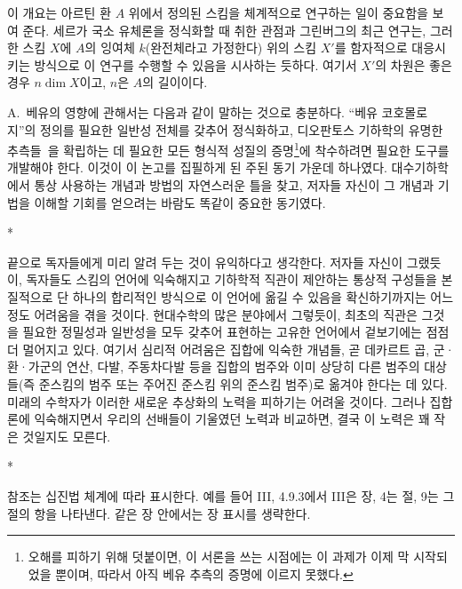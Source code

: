 이 개요는 아르틴 환 $A$ 위에서 정의된 스킴을 체계적으로 연구하는 일이 중요함을 보여 준다.
세르가 국소 유체론을 정식화할 때 취한 관점과 그린버그의 최근 연구는, 그러한 스킴 $X$에 $A$의 잉여체 $k$(완전체라고 가정한다) 위의 스킴 $X'$를 함자적으로 대응시키는 방식으로 이 연구를 수행할 수 있음을 시사하는 듯하다. 여기서 $X'$의 차원은 좋은 경우 $n\dim X$이고, $n$은 $A$의 길이이다.

A.~베유의 영향에 관해서는 다음과 같이 말하는 것으로 충분하다. ``베유 코호몰로지''의 정의를 필요한 일반성 전체를 갖추어 정식화하고, 디오판토스 기하학의 유명한 추측들~\cite{I-19}을 확립하는 데 필요한 모든 형식적 성질의 증명\footnote{오해를 피하기 위해 덧붙이면, 이 서론을 쓰는 시점에는 이 과제가 이제 막 시작되었을 뿐이며, 따라서 아직 베유 추측의 증명에 이르지 못했다.}에 착수하려면 필요한 도구를 개발해야 한다. 이것이 이 논고를 집필하게 된 주된 동기 가운데 하나였다. 대수기하학에서 통상 사용하는 개념과 방법의 자연스러운 틀을 찾고, 저자들 자신이 그 개념과 기법을 이해할 기회를 얻으려는 바람도 똑같이 중요한 동기였다.

\bigskip
\begin{center}*\quad*\quad*\end{center}
\bigskip

끝으로 독자들에게 미리 알려 두는 것이 유익하다고 생각한다. 저자들 자신이 그랬듯이, 독자들도 스킴의 언어에 익숙해지고 기하학적 직관이 제안하는 통상적 구성들을 본질적으로 단 하나의 합리적인 방식으로 이 언어에 옮길 수 있음을 확신하기까지는 어느 정도 어려움을 겪을 것이다.
현대수학의 많은 분야에서 그렇듯이, 최초의 직관은 그것을 필요한 정밀성과 일반성을 모두 갖추어 표현하는 고유한 언어에서 겉보기에는 점점 더 멀어지고 있다.
여기서 심리적 어려움은 집합에 익숙한 개념들, 곧 데카르트 곱, 군·환·가군의 연산, 다발, 주동차다발 등을 집합의 범주와 이미 상당히 다른 범주의 대상들(즉 준스킴의 범주 또는 주어진 준스킴 위의 준스킴 범주)로 옮겨야 한다는 데 있다.
미래의 수학자가 이러한 새로운 추상화의 노력을 피하기는 어려울 것이다. 그러나 집합론에 익숙해지면서 우리의 선배들이 기울였던 노력과 비교하면, 결국 이 노력은 꽤 작은 것일지도 모른다.

\bigskip
\begin{center}*\quad*\quad*\end{center}
\bigskip

참조는 십진법 체계에 따라 표시한다. 예를 들어 III, 4.9.3에서 III은 장, 4는 절, 9는 그 절의 항을 나타낸다.
같은 장 안에서는 장 표시를 생략한다.

